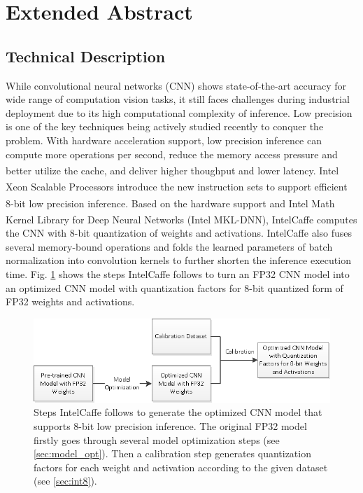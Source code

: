\section{Extended Abstract}

\subsection{Technical Description}
While convolutional neural networks (CNN) shows state-of-the-art accuracy for wide range of computation vision tasks, it still faces challenges during industrial deployment due to its high computational complexity of inference. Low precision is one of the key techniques being actively studied recently to conquer the problem. With hardware acceleration support, low precision inference can compute more operations per second, reduce the memory access pressure and better utilize the cache, and deliver higher thoughput and lower latency. Intel\textsuperscript{\textregistered} Xeon\textsuperscript{\textregistered} Scalable Processors introduce the new instruction sets \cite{bib:int8_white_paper} to support efficient 8-bit low precision inference. Based on the hardware support and Intel\textsuperscript{\textregistered} Math Kernel Library for Deep Neural Networks (Intel\textsuperscript{\textregistered} MKL-DNN), IntelCaffe computes the CNN with 8-bit quantization of weights and activations. IntelCaffe also fuses several memory-bound operations and folds the learned parameters of batch normalization \cite{DBLP:journals/corr/IoffeS15} into convolution kernels to further shorten the inference execution time. Fig. \ref{fig:int8_workflow} shows the steps IntelCaffe follows to turn an FP32 CNN model into an optimized CNN model with quantization factors for 8-bit quantized form of FP32 weights and activations.

\begin{figure}
  \includegraphics[width=\linewidth]{figures/int8_workflow.png}
  \caption{Steps IntelCaffe follows to generate the optimized CNN model that supports 8-bit low precision inference. The original FP32 model firstly goes through several model optimization steps (see \ref{sec:model_opt}). Then a calibration step generates quantization factors for each weight and activation according to the given dataset (see \ref{sec:int8}).}
  \label{fig:int8_workflow}
\end{figure}

